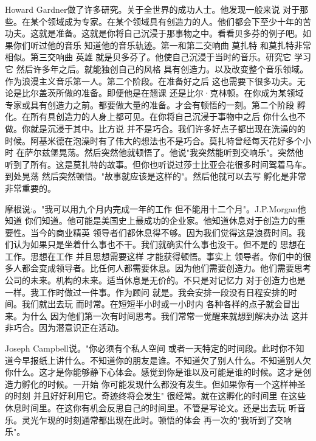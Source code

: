 Howard Gardner做了许多研究。关于全世界的成功人士。他发现一般来说 对于那些。在某个领域成为专家。在某个领域具有创造力的人。他们都会下至少十年的苦功夫。这就是准备。这就是你将自己沉浸于那事物之中。看看贝多芬的例子吧。如果你们听过他的音乐 知道他的音乐轨迹。第一和第二交响曲 莫扎特 和莫扎特非常相似。第三交响曲 英雄 就是贝多芬了。他使自己沉浸于当时的音乐。研究它 学习它 然后许多年之后。就能独创自己的风格 具有创造力。以及改变整个音乐领域。作为浪漫主义音乐第一人。第二个阶段。在准备好之后 这也需要下很多功夫。无论是比尔盖茨所做的准备。即便他是在翘课 还是比尔·克林顿。在你成为某领域专家或具有创造力之前。都要做大量的准备。才会有顿悟的一刻。第二个阶段 孵化。在所有具创造力的人身上都可见。在你将自己沉浸于事物中之后 你什么也不做。你就是沉浸于其中。比方说 并不是巧合。我们许多好点子都出现在洗澡的的时候。阿基米德在泡澡时有了伟大的想法也不是巧合。莫扎特曾经每天花好多个小时 在萨尔兹堡晃荡。然后突然他就顿悟了。他说"我突然能听到交响乐"。突然他听到了所有。这是莫扎特的故事。但你也听说过莎士比亚会花很多时间驾着马车。到处晃荡 然后突然顿悟。"故事就应该是这样的"。然后他就可以去写 孵化是非常非常重要的。 

摩根说:。"我可以用九个月内完成一年的工作 但不能用十二个月"。J.P.Morgan他知道 你们知道。他可能是美国史上最成功的企业家。他知道休息对于创造力的重要性。当今的商业精英 领导者们都休息得不够。因为我们觉得这是浪费时间。我们认为如果只是坐着什么事也不干。我们就确实什么事也没干。但不是的 思想在工作。思想在工作 并且思想需要这样 才能获得顿悟。事实上 领导者。你们中的很多人都会变成领导者。比任何人都需要休息。因为他们需要创造力。他们需要思考公司的未来。机构的未来。适当休息是无价的。不只是对记忆力 对于创造力也是一样。我工作时做过一件事。作为顾问 就是。我会安排一段没有日程安排的时间。我们就出去玩 而时常。在短短半小时或一小时内 各种各样的点子就会冒出来。为什么 因为他们第一次有时间思考。我们常常一觉醒来就想到解决办法 这并非巧合。因为潜意识正在活动。 

Joseph Campbell说。"你必须有个私人空间 或者一天特定的时间段。此时你不知道今早报纸上讲什么。不知道你的朋友是谁。不知道欠了别人什么。不知道别人欠你什么。这才是你能够静下心体会。感觉到你是谁以及可能是谁的时候。这才是创造力孵化的时候。一开始 你可能发现什么都没有发生。但如果你有一个这样神圣的时刻 并且好好利用它。奇迹终将会发生" 很经常。就在这孵化的时间里 在这些休息时间里。在这你有机会反思自己的时间里。不管是写论文。还是出去玩 听音乐。灵光乍现的时刻通常都出现在此时。顿悟的体会 再一次的"我听到了交响乐"。 

